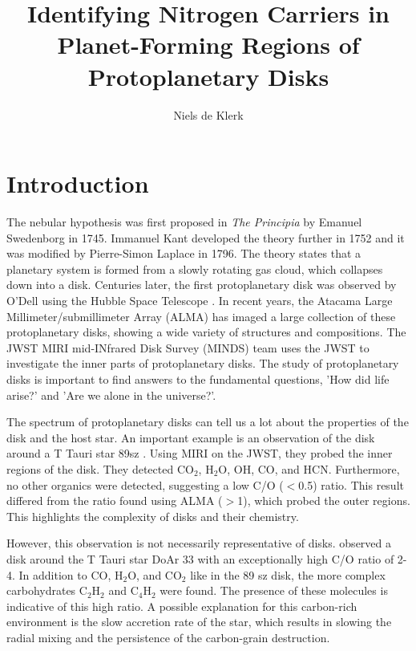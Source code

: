 \documentclass[twoside, single, authoryear, semicolon]{lion-msc}
\title{Identifying Nitrogen Carriers in Planet-Forming Regions of Protoplanetary Disks}
\author{Niels de Klerk}
\affiliation{Leiden Observatory, Universiteit Leiden}
\date{\displaydate{date}}
\newcommand{\3}{$_3$}
\newcommand{\2}{$_2$}
\begin{document}

\maketitle

\tableofcontents
\cleardoublepage
{}
\chapter{Introduction}
The nebular hypothesis was first proposed in \textit{The Principia} by Emanuel Swedenborg in 1745. Immanuel Kant developed the theory further in 1752 and it was modified by Pierre-Simon Laplace in 1796. The theory states that a planetary system is formed from a slowly rotating gas cloud, which collapses down into a disk. Centuries later, the first protoplanetary disk was observed by O'Dell using the Hubble Space Telescope \citep{ODell1993}. In recent years, the Atacama Large Millimeter/submillimeter Array (ALMA) has imaged a large collection of these protoplanetary disks, showing a wide variety of structures and compositions. The JWST MIRI mid-INfrared Disk Survey (MINDS) team uses the JWST to investigate the inner parts of protoplanetary disks. The study of protoplanetary disks is important to find answers to the fundamental questions, 'How did life arise?' and 'Are we alone in the universe?'.

The spectrum of protoplanetary disks can tell us a lot about the properties of the disk and the host star. An important example is an observation of the disk around a T Tauri star 89sz \citep{Gasman_2023}. Using MIRI on the JWST, they probed the inner regions of the disk. They detected CO$_2$, H$_2$O, OH, CO, and HCN. Furthermore, no other organics were detected, suggesting a low C/O ($<$0.5) ratio. This result differed from the ratio found using ALMA ($>$1), which probed the outer regions. This highlights the complexity of disks and their chemistry.

However, this observation is not necessarily representative of disks. \cite{colmenares2024jwstmiridetectioncarbonrichchemistry} observed a disk around the T Tauri star DoAr 33 with an exceptionally high C/O ratio of 2-4. In addition to CO, H$_2$O, and CO$_2$ like in the 89 sz disk, the more complex carbohydrates C$_2$H$_2$ and C$_4$H$_2$ were found. The presence of these molecules is indicative of this high ratio. A possible explanation for this carbon-rich environment is the slow accretion rate of the star, which results in slowing the radial mixing and the persistence of the carbon-grain destruction.
\end{document}
